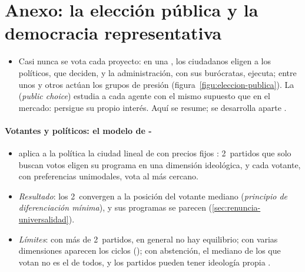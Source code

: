 \documentclass[11pt]{article}
\begin{document}
\section{Anexo: la elección pública y la democracia representativa}\label{anexo:eleccion-publica}

\begin{itemize}
\item Casi nunca se vota cada proyecto: en una , los ciudadanos eligen a los políticos, que deciden, y la administración, con sus burócratas, ejecuta; entre unos y otros actúan los grupos de presión (figura~\ref{figu:eleccion-publica}). La  (\emph{public choice}) estudia a cada agente con el mismo supuesto que en el mercado: persigue su propio interés\nocite{BuchananTullock1962Calculus,Mueller2003Public}. Aquí se resume; se desarrolla aparte  .
\end{itemize}

\begin{infografia}[H]
\centering
\caption{Los agentes de la elección pública en una democracia representativa}\label{figu:eleccion-publica}
\end{infografia}

\paragraph{Votantes y políticos: el modelo de -}

\begin{itemize}
\item \textcite{Downs1957Economic} aplica a la política la ciudad lineal de \textcite{Hotelling1929Stability} con precios fijos : 2~partidos que solo buscan votos eligen su programa en una dimensión ideológica, y cada votante, con preferencias unimodales, vota al más cercano.
\item \emph{Resultado}: los 2~convergen a la posición del votante mediano (\emph{principio de diferenciación mínima}), y sus programas se parecen (\ref{sec:renuncia-universalidad}).
\item \emph{Límites}: con más de 2~partidos, en general no hay equilibrio; con varias dimensiones aparecen los ciclos (); con abstención, el mediano de los que votan no es el de todos, y los partidos pueden tener ideología propia .
\end{itemize}
\end{document}
